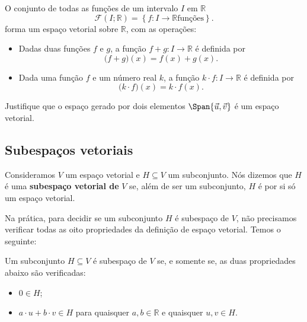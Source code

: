 \begin{ex}\label{funcoes}
  O conjunto de todas as funções de um intervalo $I$ em $\mathbb{R}$
  \begin{equation}
    \mathcal{F} (I;\mathbb{R}) = \left\{ f: I \to \mathbb{R} \text{funções} \right\}.
  \end{equation}
  forma um espaço vetorial sobre $\mathbb{R}$, com as operações:
  \begin{itemize}
  \item Dadas duas funções $f$ e $g$, a função $f+g : I \to \mathbb{R}$ é definida por
    \begin{equation}
    \big( f+g \big) (x) = f(x) + g(x).
    \end{equation}
  \item Dada uma função $f$ e um número real $k$, a função $k \cdot f : I \to \mathbb{R}$ é definida por
    \begin{equation}
    \big( k \cdot f \big) (x) = k \cdot f(x).
    \end{equation}
  \end{itemize}
\end{ex}


\begin{exer}
	Justifique que o espaço gerado por dois elementos $\Span \{ \vec{u}, \vec{v} \}$ é um espaço vetorial.
\end{exer}


\subsection{Subespaços vetoriais}

Consideramos $V$ um espaço vetorial e $H\subseteq V$ um subconjunto. Nós dizemos que $H$ é uma \textbf{subespaço vetorial de} $V$ se, além de ser um subconjunto, $H$ é por si só um espaço vetorial.

Na prática, para decidir se um subconjunto $H$ é subespaço de $V$, não precisamos verificar todas as oito propriedades da definição de espaço vetorial. Temos o seguinte:

\begin{teo}
	Um subconjunto $H \subseteq V$ é subespaço de $V$ se, e somente se, as duas propriedades abaixo são verificadas:
	\begin{itemize}
		\item $0 \in H$;
		\item $a\cdot u + b \cdot v \in H$ para quaisquer $a, b \in \mathbb{R}$ e quaisquer $u,v \in H$.
	\end{itemize}
\end{teo}


